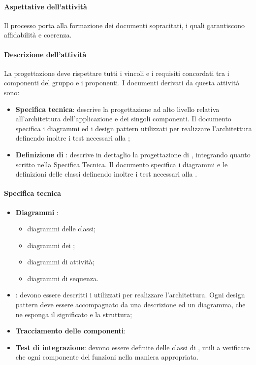  \paragraph{Aspettative dell'attività}
 Il processo porta alla formazione dei documenti sopracitati, i quali garantiscono affidabilità e
 coerenza.
 \paragraph{Descrizione dell'attività}
 La progettazione deve rispettare tutti i vincoli e i requisiti concordati tra i componenti del gruppo
 e i proponenti. I documenti derivati da questa attività sono:
 \begin{itemize}
 	\item \textbf{Specifica tecnica}: descrive la progettazione ad alto livello relativa all'architettura dell'applicazione
 	e dei singoli componenti. Il documento specifica i diagrammi  ed i design
 	pattern utilizzati per realizzare l'architettura definendo inoltre i test necessari alla ;
 	\item \textbf{Definizione di }: descrive in dettaglio la progettazione di , integrando
 	quanto scritto nella Specifica Tecnica. Il documento specifica i diagrammi  e le
 	definizioni delle classi definendo inoltre i test necessari alla .
 \end{itemize}
 \paragraph{Specifica tecnica}
 \begin{itemize} 
 	\item \textbf{Diagrammi }:
 	\begin{itemize}
 		\item diagrammi delle classi;
 		\item diagrammi dei ;
 		\item diagrammi di attività;
 		\item diagrammi di sequenza.
 	\end{itemize}
 	\item \textbf{}: devono essere descritti i  utilizzati per realizzare l'architettura. Ogni design
 	pattern deve essere accompagnato da una descrizione ed un diagramma, che ne esponga il
 	significato e la struttura;
 	\item \textbf{Tracciamento delle componenti}:
 	\item \textbf{Test di integrazione}: devono essere definite delle classi di , utili a verificare che ogni componente del
 	 funzioni nella maniera appropriata.
 \end{itemize}
